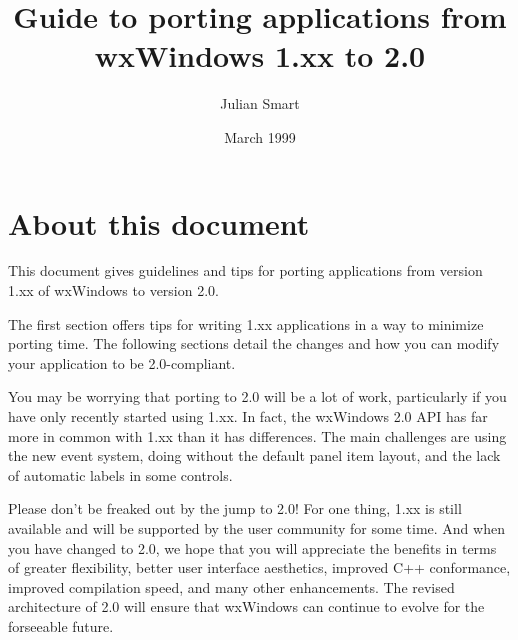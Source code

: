 \newcommand{\indexit}[1]{#1\index{#1}}%
\newcommand{\pipe}[0]{$\|$\ }%
%
%
%
%
%
%
%
%

\parskip=10pt
\parindent=0pt
\title{Guide to porting applications from wxWindows 1.xx to 2.0}
\author{Julian Smart}
\date{March 1999}
\makeindex

\maketitle
\pagestyle{fancyplain}

\setfooter{\thepage}{}{}{}{}{\thepage}%
\tableofcontents
%
\chapter{About this document}\label{about}
%
%
\setfooter{\thepage}{}{}{}{}{\thepage}%

This document gives guidelines and tips for porting applications from
version 1.xx of wxWindows to version 2.0.

The first section offers tips for writing 1.xx applications in a way to
minimize porting time. The following sections detail the changes and
how you can modify your application to be 2.0-compliant.

You may be worrying that porting to 2.0 will be a lot of work,
particularly if you have only recently started using 1.xx. In fact,
the wxWindows 2.0 API has far more in common with 1.xx than it has differences.
The main challenges are using the new event system, doing without the default
panel item layout, and the lack of automatic labels in some controls.

Please don't be freaked out by the jump to 2.0! For one thing, 1.xx is still available
and will be supported by the user community for some time. And when you have
changed to 2.0, we hope that you will appreciate the benefits in terms
of greater flexibility, better user interface aesthetics, improved C++ conformance,
improved compilation speed, and many other enhancements. The revised architecture
of 2.0 will ensure that wxWindows can continue to evolve for the forseeable
future.

